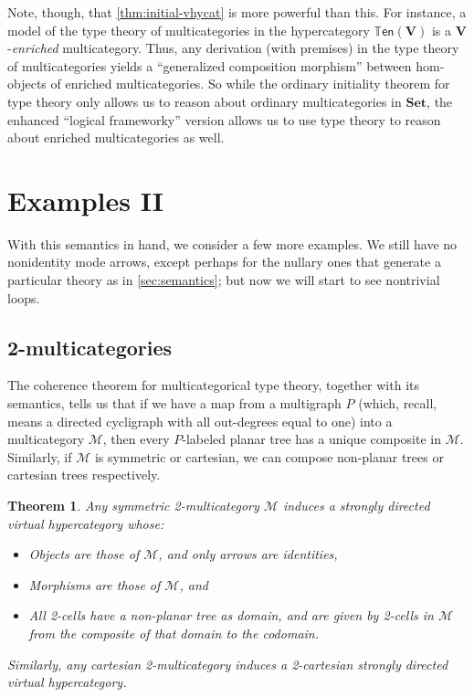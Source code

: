 \documentclass{article}
\newtheorem{thm}{Theorem}[section]
\theoremstyle{definition}
\theoremstyle{remark}
\def\cM{\mathcal{M}}
\def\ten{\mathbb{T}\mathsf{en}}
\def\Set{\mathbf{Set}}
\begin{document}
Note, though, that \cref{thm:initial-vhycat} is more powerful than this.
For instance, a model of the type theory of multicategories in the hypercategory $\ten(\mathbf{V})$ is a $\mathbf{V}$-\emph{enriched} multicategory.
Thus, any derivation (with premises) in the type theory of multicategories yields a ``generalized composition morphism'' between hom-objects of enriched multicategories.
So while the ordinary initiality theorem for type theory only allows us to reason about ordinary multicategories in $\Set$, the enhanced ``logical frameworky'' version allows us to use type theory to reason about enriched multicategories as well.


\section{Examples II}
\label{sec:examples2}

With this semantics in hand, we consider a few more examples.
We still have no nonidentity mode arrows, except perhaps for the nullary ones that generate a particular theory as in \cref{sec:semantics}; but now we will start to see nontrivial loops.


\subsection{2-multicategories}
\label{sec:2-multicategories}

The coherence theorem for multicategorical type theory, together with its semantics, tells us that if we have a map from a multigraph $P$ (which, recall, means a directed cycligraph with all out-degrees equal to one) into a multicategory $\cM$, then every $P$-labeled planar tree has a unique composite in $\cM$.
Similarly, if $\cM$ is symmetric or cartesian, we can compose non-planar trees or cartesian trees respectively.

\begin{thm}
  Any symmetric 2-multicategory $\cM$ induces a strongly directed virtual hypercategory whose:
  \begin{itemize}
  \item Objects are those of $\cM$, and only arrows are identities,
  \item Morphisms are those of $\cM$, and
  \item All 2-cells have a non-planar tree as domain, and are given by 2-cells in $\cM$ from the composite of that domain to the codomain.
  \end{itemize}
  Similarly, any cartesian 2-multicategory induces a 2-cartesian strongly directed virtual hypercategory.
\end{thm}
\end{document}
